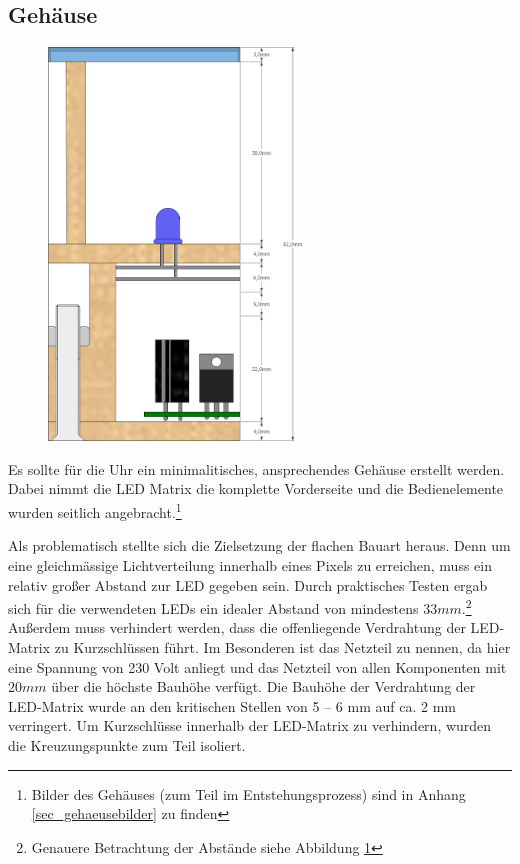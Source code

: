 \subsection{Gehäuse}
\begin{figure}[htp]
\begin{center}
\includegraphics[width=0.6\textwidth]{skizzen/querschnitt.png}
\label{fig_querschnitt}
\end{center}
\end{figure}
%
Es sollte für die Uhr ein minimalitisches, ansprechendes Gehäuse erstellt
werden.
Dabei nimmt die LED Matrix die komplette Vorderseite und die Bedienelemente
wurden seitlich angebracht.\footnote{Bilder des Gehäuses (zum Teil im Entstehungsprozess) sind in Anhang \ref{sec_gehaeusebilder} zu finden}

Als problematisch stellte sich die Zielsetzung der flachen Bauart heraus. Denn um eine gleichmässige Lichtverteilung innerhalb eines Pixels zu erreichen, muss ein relativ großer Abstand zur LED gegeben sein. Durch praktisches Testen ergab sich für die verwendeten LEDs ein idealer Abstand von mindestens $33mm$.\footnote{Genauere Betrachtung der Abstände siehe Abbildung \ref{fig_querschnitt}}
Außerdem muss verhindert werden, dass die offenliegende Verdrahtung der LED-Matrix zu Kurzschlüssen führt. Im Besonderen ist das Netzteil zu nennen, da hier eine Spannung von 230 Volt anliegt und das Netzteil von allen Komponenten mit $20 mm$ über die höchste Bauhöhe verfügt. 
Die Bauhöhe der Verdrahtung der LED-Matrix wurde an den kritischen Stellen von 5 -- 6 mm auf ca. 2 mm verringert. Um Kurzschlüsse innerhalb der LED-Matrix zu verhindern, wurden die Kreuzungspunkte zum Teil isoliert.

